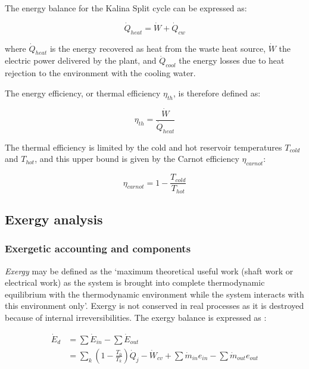 \documentclass[final,times,3p]{elsarticle}
\begin{document}

	The energy balance for the Kalina Split cycle can be expressed as: 

	\begin{equation}
	 \dot{Q}_{heat}=\dot{W}+\dot{Q}_{cw}
	\end{equation}	

	where $\dot{Q}_{heat}$ is the energy recovered as heat from the waste heat source, $\dot{W}$ the electric power delivered by the plant, and $\dot{Q}_{cool}$ the energy losses due to heat rejection to the environment with the cooling water.
	
	The energy efficiency, or thermal efficiency $\eta_{th}$, is therefore defined as:
	
	\begin{equation}
		\eta_{th} = \frac{\dot{W}}{\dot{Q}_{heat}} 
	\end{equation}	

	The thermal efficiency is limited by the cold and hot reservoir temperatures $T_{cold}$ and $T_{hot}$, and this upper bound is given by the Carnot efficiency $\eta_{carnot}$:
	
	\begin{equation}
		\eta_{carnot} = 1-\frac{T_{cold}}{T_{hot}} 
	\end{equation}
	
	\subsection{Exergy analysis}
	\label{subsec:exergy_analysis}

	\subsubsection{Exergetic accounting and components}
	
	\emph{Exergy} may be defined as the `maximum theoretical useful work (shaft work or electrical work) as the system is brought into complete thermodynamic equilibrium with the thermodynamic environment while the system interacts with this environment only'. Exergy is not conserved in real processes as it is destroyed because of internal irreversibilities. The exergy balance is expressed as \cite{BejanAdrian;TsatsaronisGeorge;Moran1996}: 

	\begin{align}
		\dot{E}_d&=\sum \dot{E}_{in} - \sum \dot{E}_{out} \nonumber\\
					     &=\sum_k \left (1-\frac{T_0}{T_k} \right ) \dot{Q}_j-\dot{W}_{cv}+\sum \dot{m}_{in} e_{in} - \sum \dot{m}_{out} e_{out}
	\end{align}
\end{document}
